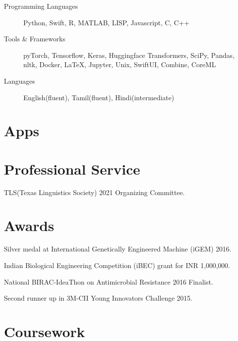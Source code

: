 \documentclass[10pt,a4paper]{mycv}
\begin{document}
\begin{description}
\item[Programming Languages] Python, Swift, R, MATLAB, LISP, Javascript, C, C++

\item[Tools \& Frameworks] pyTorch, Tensorflow, Keras, Huggingface Transformers, SciPy, Pandas, nltk, Docker, \LaTeX, Jupyter, Unix, SwiftUI, Combine, CoreML

\item[Languages] English(fluent), Tamil(fluent), Hindi(intermediate)
\end{description}


\section{Apps}


\section{Professional Service}

TLS(Texas Linguistics Society) 2021 Organizing Committee.

\section{Awards}

Silver medal at International Genetically Engineered Machine (iGEM) 2016.

Indian Biological Engineering Competition (iBEC) grant for INR 1,000,000.

National BIRAC-IdeaThon on Antimicrobial Resistance 2016 Finalist.

Second runner up in 3M-CII Young Innovators Challenge 2015.

\section{Coursework}

\end{document}
